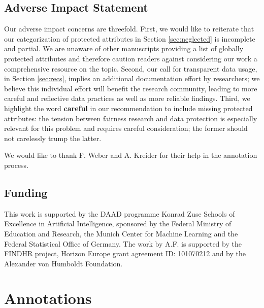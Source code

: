 \subsection*{Adverse Impact Statement}
Our adverse impact concerns are threefold. First, we would like to reiterate that our categorization of protected attributes in Section \ref{sec:neglected} is incomplete and partial. We are unaware of other manuscripts providing a list of globally protected attributes and therefore caution readers against considering our work a comprehensive resource on the topic. Second, our call for transparent data usage, in Section \ref{sec:recs}, implies an additional documentation effort by researchers; we believe this individual effort will benefit the research community, leading to more careful and reflective data practices as well as more reliable findings. Third, we highlight the word \textbf{careful} in our recommendation to include missing protected attributes: the tension between fairness research and data protection is especially relevant for this problem and requires careful consideration; the former should not carelessly trump the latter.

\begin{acks}

We would like to thank F. Weber and A. Kreider for their help in the annotation process.

\subsection*{Funding}

This work is supported by the DAAD programme Konrad Zuse Schools of Excellence in Artificial Intelligence, sponsored by the Federal Ministry of Education and Research, the Munich Center for Machine Learning and the Federal Statistical Office of Germany. The work by A.F. is supported by the FINDHR project, Horizon Europe grant agreement ID: 101070212 and by the Alexander von Humboldt Foundation.

\end{acks}




\appendix

\section{Annotations} \label{annotation-process}


